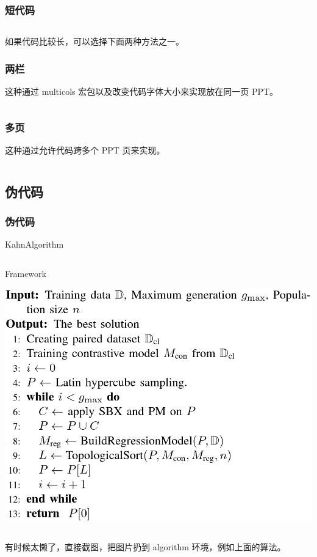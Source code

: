 \documentclass[
    10pt,
    pdf,
    UTF8,
    aspectratio=169
]{ctexbeamer}
\begin{document}
\begin{frame}
    \frametitle{短代码}
    \inputminted[linenos]{cpp}{./code/demo.cpp}
    \hspace{2em} 如果代码比较长，可以选择下面两种方法之一。
\end{frame}

\begin{frame}
    \frametitle{两栏}
    这种通过 multicols 宏包以及改变代码字体大小来实现放在同一页 PPT。
    \begin{multicols}{2}
        \inputminted[linenos,fontsize=\scriptsize]{cpp}{./code/quicksort.cpp}
    \end{multicols}
\end{frame}

\begin{frame}[allowframebreaks]
    \frametitle{多页}
    这种通过允许代码跨多个 PPT 页来实现。
    \inputminted[linenos]{cpp}{./code/quicksort.cpp}
\end{frame}

\subsection{伪代码}

\begin{frame}[allowframebreaks]
    \frametitle{伪代码}
    \begin{algorithm}[H]
        \scriptsize
        \caption{KahnAlgorithm}
        \label{algo:kaha}
        
    \end{algorithm}
    \begin{columns}
        \begin{column}{0.65\textwidth}
            \begin{algorithm}[H]
                \scriptsize
                \caption{Framework}
                \label{aglo:figure}
                \includegraphics[width=\textwidth]{./algo/figure.png}
            \end{algorithm}
        \end{column}
    \end{columns}
    \hspace{2em} 有时候太懒了，直接截图，把图片扔到 algorithm 环境，例如上面的算法。
\end{frame}
\end{document}

